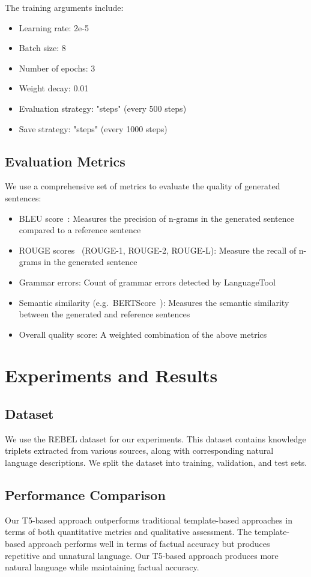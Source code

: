 \documentclass[3p,times,procedia]{elsarticle}
\begin{document}
The training arguments include:
\begin{itemize}
    \item Learning rate: 2e-5
    \item Batch size: 8
    \item Number of epochs: 3
    \item Weight decay: 0.01
    \item Evaluation strategy: "steps" (every 500 steps)
    \item Save strategy: "steps" (every 1000 steps)
\end{itemize}

\subsection{Evaluation Metrics}
We use a comprehensive set of metrics to evaluate the quality of generated sentences:
\begin{itemize}
    \item BLEU score~\cite{papineni2002bleu}: Measures the precision of n-grams in the generated sentence compared to a reference sentence
    \item ROUGE scores~\cite{lin2004rouge} (ROUGE-1, ROUGE-2, ROUGE-L): Measure the recall of n-grams in the generated sentence
    \item Grammar errors: Count of grammar errors detected by LanguageTool
    \item Semantic similarity (e.g.\ BERTScore~\cite{zhang2020bertscore}): Measures the semantic similarity between the generated and reference sentences
    \item Overall quality score: A weighted combination of the above metrics
\end{itemize}

\section{Experiments and Results}
\subsection{Dataset}
We use the REBEL dataset for our experiments. This dataset contains knowledge triplets extracted from various sources, along with corresponding natural language descriptions. We split the dataset into training, validation, and test sets.

\subsection{Performance Comparison}
Our T5-based approach outperforms traditional template-based approaches in terms of both quantitative metrics and qualitative assessment. The template-based approach performs well in terms of factual accuracy but produces repetitive and unnatural language. Our T5-based approach produces more natural language while maintaining factual accuracy.
\end{document}
